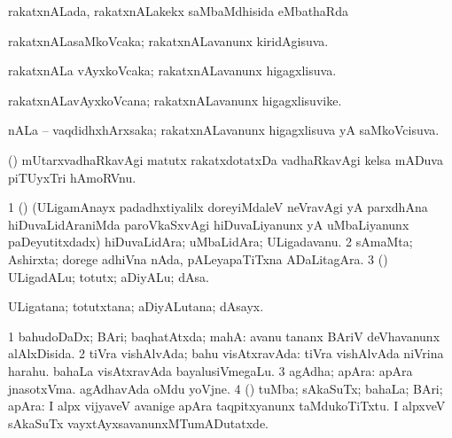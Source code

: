 \bentry
{} 
\gl{\sapUpa}
\expl{}
\bmng
 rakatxnALada, rakatxnALakekx saMbaMdhisida eMbathaRda \sapUpa 
\emng
\eentry

\bentry
{} 
\gl{\gu}
\expl{}
\bmng
\emng
\eentry

\bentry
{} 
\gl{\gu}
\expl{}
\bmng
 rakatxnALasaMkoVcaka; rakatxnALavanunx kiridAgisuva. 
\emng
\eentry

\bentry
{} 
\gl{\gu}
\expl{}
\bmng
 rakatxnALa vAyxkoVcaka; rakatxnALavanunx higagxlisuva. 
\emng
\eentry

\bentry
{} 
\gl{\nA}
\expl{}
\bmng
 rakatxnALavAyxkoVcana; rakatxnALavanunx higagxlisuvike. 
\emng
\eentry

\bentry
{} 
\gl{\gu}
\expl{}
\bmng
 nALa -- vaqdidhxhArxsaka; rakatxnALavanunx higagxlisuva yA saMkoVcisuva. 
\emng
\eentry

\bentry
{} 
\gl{\nA}
\expl{}
\bmng
 (\jiVra) mUtarxvadhaRkavAgi matutx rakatxdotatxDa vadhaRkavAgi kelsa mADuva piTUyxTri hAmoRVnu. 
\emng
\eentry

\bentry
{} 
\gl{\nA}
\expl{}
\bmng
\bnum
\num{1} (\ca) (ULigamAnayx padadhxtiyalilx doreyiMdaleV neVravAgi yA parxdhAna hiDuvaLidAraniMda paroVkaSxvAgi hiDuvaLiyanunx yA uMbaLiyanunx paDeyutitxdadx) hiDuvaLidAra; uMbaLidAra; ULigadavanu. 
\num{2} sAmaMta; Ashirxta; dorege adhiVna nAda, pALeyapaTiTxna ADaLitagAra. 
\num{3} (\rUpa) ULigadALu; totutx; aDiyALu; dAsa. 
\enum
\emng
\eentry

\bentry
{} 
\gl{\nA}
\expl{}
\bmng
 ULigatana; totutxtana; aDiyALutana; dAsayx. 
\emng
\eentry

\bentry
{} 
\gl{\gu}
\expl{}
\bmng
\bnum
\num{1} bahudoDaDx; BAri; baqhatAtxda; mahA:  avanu tananx BAriV deVhavanunx alAlxDisida. 
\num{2} tiVra vishAlvAda; bahu visAtxravAda:  tiVra vishAlvAda niVrina harahu.  bahaLa visAtxravAda bayalusiVmegaLu. 
\num{3} agAdha; apAra:  apAra jnasotxVma.  agAdhavAda oMdu yoVjne. 
\num{4} (\AmA) tuMba; sAkaSuTx; bahaLa; BAri; apAra:  I alpx vijyaveV avanige apAra taqpitxyanunx taMdukoTiTxtu.  I alpxveV sAkaSuTx vayxtAyxsavanunxMTumADutatxde. 
\enum
\emng
\eentry

